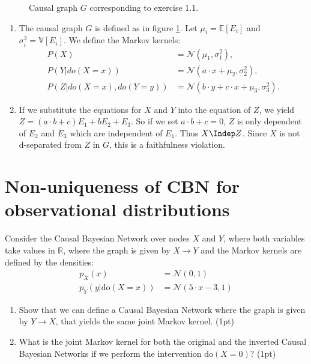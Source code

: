 \begin{gradedsolution}
  \begin{figure}[ht]
    \centering
    \caption{Causal graph $G$ corresponding to exercise 1.1.}
    \label{fig:one}
  \end{figure}
  \begin{enumerate}
    \item The causal graph $G$ is defined as in figure \ref{fig:one}. Let $\mu_i = \mathbb{E}[E_i]$ and $\sigma^2_i = \mathbb{V}[E_i]$. We define the Markov kernels:
    \begin{align*}
      P(X) &= \mathcal{N}(\mu_1, \sigma^2_1),\\
      P(Y|do(X=x)) &= \mathcal{N}(a\cdot x + \mu_2, \sigma^2_2),\\
      P(Z|do(X=x), do(Y=y)) &= \mathcal{N}(b\cdot y + c\cdot x + \mu_3, \sigma^2_3).
    \end{align*}
    \item If we substitute the equations for $X$ and $Y$ into the equation of $Z$, we yield $Z= (a\cdot b+c)E_1 + b E_2 + E_3$. So if we set $a\cdot b+c = 0$, $Z$ is only dependent of $E_2$ and $E_3$ which are independent of $E_1$. Thus $ X\Indep Z$. Since $X$ is not d-separated from $Z$ in $G$, this is a faithfulness violation.
  \end{enumerate}
\end{gradedsolution}




\section{Non-uniqueness of CBN for observational distributions}
Consider the Causal Bayesian Network over nodes $X$ and $Y$, where both variables take values in $\mathbb{R}$, where the graph is given by $X \rightarrow Y$ and the Markov kernels are defined by the densities:
\begin{align*}
  p_X(x) &= \mathcal{N}(0,1) \\
  p_Y(y|\text{do}(X=x)) &= \mathcal{N}(5\cdot x -3, 1)
\end{align*}
\begin{enumerate}
  \item Show that we can define a Causal Bayesian Network where the graph is given by $Y \rightarrow X$, that yields the same joint Markov kernel. (1pt)
  \item What is the joint Markov kernel for both the original and the inverted Causal Bayesian Networks if we perform the intervention do$(X=0)$? (1pt)
\end{enumerate}

